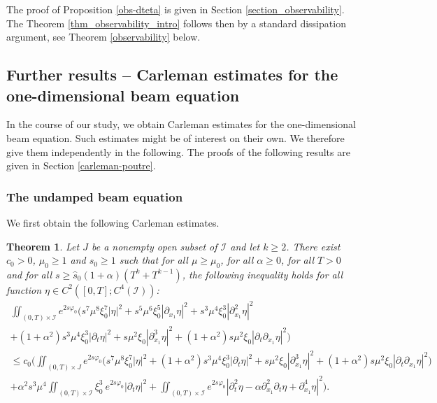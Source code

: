 \documentclass[a4paper, 12pt]{article}
\theoremstyle{plain}
\newtheorem{theorem}{Theorem}[section]
\theoremstyle{definition}
\numberwithin{theorem}{section}
\numberwithin{equation}{section}
\begin{document}
The proof of Proposition \ref{obs-dteta} is given in Section \ref{section_observability}.
The Theorem \ref{thm_observability_intro} follows then by a standard dissipation argument, see Theorem \ref{observability} below.

\subsection{Further results -- Carleman estimates for the one-dimensional beam equation}

In the course of our study, we obtain Carleman estimates for the one-dimensional beam equation. 
Such estimates might be of interest on their own. We therefore give them independently in the following. The proofs of the following results are given in Section  \ref{carleman-poutre}.



\subsubsection{The undamped beam equation}



We first obtain the following Carleman estimates. 

\begin{theorem}\label{poutre2}
Let $J$ be a nonempty open subset of $\mathcal{I}$ and let $k\geq 2$. There exist $c_0>0$, $\mu_0\geq 1$ and $\widehat{s}_0\geq 1$ such that for all $\mu\geq\mu_0$, for all $\alpha\geq 0$, for all $T>0$ and for all $s\geq \widehat{s}_0(1+\alpha)(T^k+T^{k-1})$, the following inequality holds for all function $\eta\in C^2([0,T];C^4(\mathcal{I}))$:
\begin{multline}\label{poutre-theorem3}
\iint_{(0,T)\times\mathcal{I}}e^{2s\varphi_0}\Big(s^7\mu^8\xi^7_0|\eta|^2+s^5\mu^6\xi_0^5|\partial_{x_1}\eta|^2+s^3\mu^4\xi_0^3|\partial^2_{x_1}\eta|^2\\
+(1+\alpha^2)s^3\mu^4\xi_0^3|\partial_t\eta|^2+s\mu^2\xi_0|\partial^3_{x_1}\eta|^2+(1+\alpha^2)s\mu^2\xi_0|\partial_t\partial_{x_1}\eta|^2\Big)\\
\leq c_0\Big(\iint_{(0,T)\times J}e^{2s\varphi_0}\Big(s^7\mu^8\xi^7_0|\eta|^2+(1+\alpha^2)s^3\mu^4\xi_0^3|\partial_t\eta|^2+s\mu^2\xi_0|\partial^3_{x_1}\eta|^2+(1+\alpha^2)s\mu^2\xi_0|\partial_t\partial_{x_1}\eta|^2\Big)\\
+\alpha^2 s^3\mu^4\iint_{(0,T)\times\mathcal{I}}\xi_0^3~e^{2s\varphi_0}|\partial_t \eta|^2+\iint_{(0,T)\times\mathcal{I}}e^{2s\varphi_0}|\partial^2_t\eta-\alpha\partial^2_{x_1}\partial_t\eta+\partial^4_{x_1}\eta|^2\Big).
\end{multline} 
\end{theorem}
\end{document}

